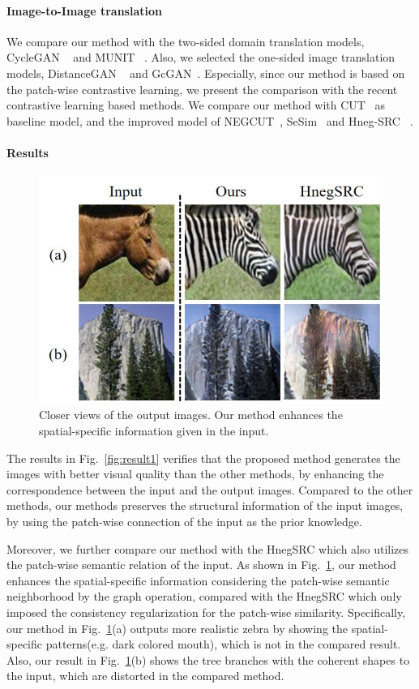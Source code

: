 \documentclass[letterpaper]{article} %
\begin{document}
\paragraph{Image-to-Image translation}



We compare our method with the two-sided domain translation models, CycleGAN ~\cite{cyclegan} and MUNIT ~\cite{munit}. Also, we selected the one-sided image translation models, DistanceGAN ~\cite{distancegan} and GcGAN~\cite{gcgan}.
Especially, since our method is based on the patch-wise contrastive learning, we present the comparison with the recent contrastive learning based methods. We compare our method with CUT~\cite{cut} as baseline model, and the improved model of NEGCUT~\cite{negcut}, SeSim~\cite{sesim} and Hneg-SRC ~\cite{HnegSRC}.

\paragraph{Results}
\begin{figure}[!t]
\centering
\includegraphics[width=0.85\columnwidth]{figs/spatial_specific_2.jpg}
\caption{Closer views of the output images. Our method enhances the spatial-specific information given in the input.}
\label{fig:spatial_specific}
\end{figure}


The results in Fig.~\ref{fig:result1} verifies that the proposed method generates the images with better visual quality than the other methods, by enhancing the correspondence between the input and the output images. Compared to the other methods, our methods preserves the structural information of the input images, by using the patch-wise connection of the input as the prior knowledge.

Moreover, we further compare our method with the HnegSRC which also utilizes the patch-wise semantic relation of the input. As shown in Fig.~\ref{fig:spatial_specific}, our method enhances the spatial-specific information considering the patch-wise semantic neighborhood by the graph operation, compared with the HnegSRC which only imposed the consistency regularization for the patch-wise similarity. Specifically, our method in Fig.~\ref{fig:spatial_specific}(a) outputs more realistic zebra by showing the spatial-specific patterns(e.g. dark colored mouth), which is not in the compared result. Also, our result in Fig.~\ref{fig:spatial_specific}(b) shows the tree branches with the coherent shapes to the input, which are distorted in the compared method.
\end{document}
